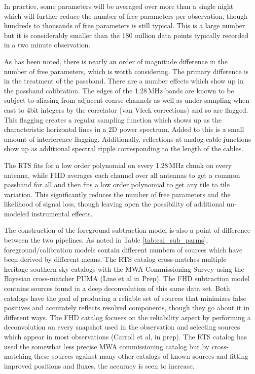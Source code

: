 \documentclass[twolcolumn]{emulateapj}
\begin{document}
In practice, some parameters will be averaged over more than a single night which will further reduce the number of free parameters per observation, though hundreds to thousands of free parameters is still typical. This is a large number but it is considerably smaller than the 180 million data points typically recorded in a two minute observation. 

As has been noted, there is nearly an order of magnitude difference in the number of free parameters, which is worth considering. The primary difference is in the treatment of the passband.  There are a number effects which show up in the passband calibration. The edges of the 1.28\,MHz bands are known to be subject to aliasing from adjacent coarse channels as well as under-sampling when cast to 4bit integers by the correlator (van Vleck corrections) and so are flagged. This flagging creates a regular sampling function which shows up as the characteristic horizontal lines in a 2D power spectrum. Added to this is a small amount of interference flagging.  Additionally, reflections at analog cable junctions show up as additional spectral ripple corresponding to the length of the cables.    

The RTS fits for a low order polynomial on every 1.28\,MHz chunk on every antenna, while FHD averages each channel over all antennas to get a common passband for all and then fits a low order polynomial to get any tile to tile variation. This significantly reduces the number of free parameters and the likelihood of signal loss, though leaving open the possibility of additional un-modeled instrumental effects.

The construction of the foreground subtraction model is also a point of difference between the two pipelines.
As noted in Table \ref{tab:cal_sub_parms}, foreground/calibration models contain different numbers of sources which have been derived by different means. The RTS catalog cross-matches multiple heritage southern sky catalogs with the MWA Commissioning Survey using the Bayesian cross-matcher PUMA (Line et al in Prep).  The FHD subtraction model contains sources found in a deep deconvolution of this same data set. Both catalogs have the goal of producing a reliable set of sources that minimizes false positives and accurately reflects resolved components, though they go about it in different ways. The FHD catalog focuses on the reliability aspect by performing a deconvolution on every snapshot used in the observation and selecting sources which appear in most observations (Carroll et al, in prep). The RTS catalog has used the somewhat less precise MWA commissioning catalog but by cross-matching these sources against many other catalogs of known sources and fitting improved positions and fluxes, the accuracy is seen to increase.
\end{document}
